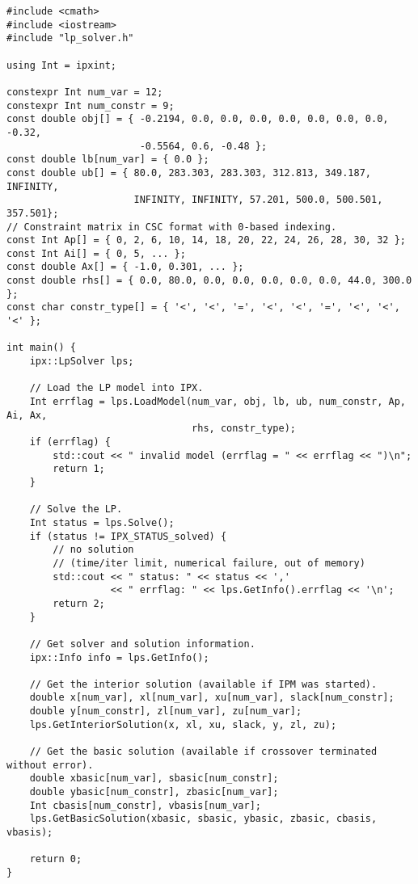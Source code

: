 \documentclass{article}
\begin{document}
\newpage
\begin{footnotesize}
\begin{verbatim}
#include <cmath>
#include <iostream>
#include "lp_solver.h"

using Int = ipxint;

constexpr Int num_var = 12;
constexpr Int num_constr = 9;
const double obj[] = { -0.2194, 0.0, 0.0, 0.0, 0.0, 0.0, 0.0, 0.0, -0.32,
                       -0.5564, 0.6, -0.48 };
const double lb[num_var] = { 0.0 };
const double ub[] = { 80.0, 283.303, 283.303, 312.813, 349.187, INFINITY,
                      INFINITY, INFINITY, 57.201, 500.0, 500.501, 357.501};
// Constraint matrix in CSC format with 0-based indexing.
const Int Ap[] = { 0, 2, 6, 10, 14, 18, 20, 22, 24, 26, 28, 30, 32 };
const Int Ai[] = { 0, 5, ... };
const double Ax[] = { -1.0, 0.301, ... };
const double rhs[] = { 0.0, 80.0, 0.0, 0.0, 0.0, 0.0, 0.0, 44.0, 300.0 };
const char constr_type[] = { '<', '<', '=', '<', '<', '=', '<', '<', '<' };

int main() {
    ipx::LpSolver lps;

    // Load the LP model into IPX.
    Int errflag = lps.LoadModel(num_var, obj, lb, ub, num_constr, Ap, Ai, Ax,
                                rhs, constr_type);
    if (errflag) {
        std::cout << " invalid model (errflag = " << errflag << ")\n";
        return 1;
    }

    // Solve the LP.
    Int status = lps.Solve();
    if (status != IPX_STATUS_solved) {
        // no solution
        // (time/iter limit, numerical failure, out of memory)
        std::cout << " status: " << status << ','
                  << " errflag: " << lps.GetInfo().errflag << '\n';
        return 2;
    }

    // Get solver and solution information.
    ipx::Info info = lps.GetInfo();

    // Get the interior solution (available if IPM was started).
    double x[num_var], xl[num_var], xu[num_var], slack[num_constr];
    double y[num_constr], zl[num_var], zu[num_var];
    lps.GetInteriorSolution(x, xl, xu, slack, y, zl, zu);

    // Get the basic solution (available if crossover terminated without error).
    double xbasic[num_var], sbasic[num_constr];
    double ybasic[num_constr], zbasic[num_var];
    Int cbasis[num_constr], vbasis[num_var];
    lps.GetBasicSolution(xbasic, sbasic, ybasic, zbasic, cbasis, vbasis);

    return 0;
}
\end{verbatim}
\end{footnotesize}
\end{document}
